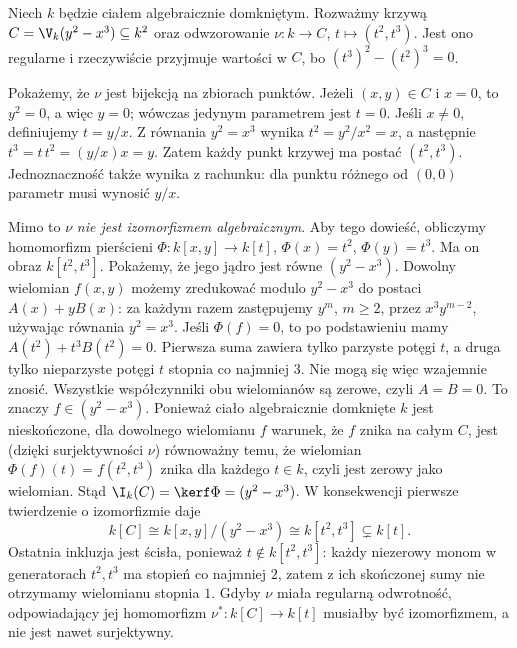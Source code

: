 \begin{przyklad}
\label{pr:cusp}
Niech $k$ będzie ciałem algebraicznie domkniętym.
Rozważmy krzywą
$C=\V_k(y^2-x^3)\subseteq k^2$ oraz odwzorowanie
$\nu:k\to C$, $t\mapsto(t^2,t^3)$.
Jest ono regularne i rzeczywiście przyjmuje wartości w $C$,
bo $(t^3)^2-(t^2)^3=0$.

Pokażemy, że $\nu$ jest bijekcją na zbiorach punktów.
Jeżeli $(x,y)\in C$ i $x=0$, to $y^2=0$, a więc $y=0$;
wówczas jedynym parametrem jest $t=0$.
Jeśli $x\ne0$, definiujemy $t=y/x$. Z równania $y^2=x^3$
wynika $t^2=y^2/x^2=x$, a następnie
$t^3=t\,t^2=(y/x)x=y$. Zatem każdy punkt krzywej ma postać
$(t^2,t^3)$. Jednoznaczność także wynika z rachunku:
dla punktu różnego od $(0,0)$ parametr musi wynosić $y/x$.

Mimo to $\nu$ \emph{nie jest izomorfizmem algebraicznym}.
Aby tego dowieść, obliczymy homomorfizm pierścieni
$\Phi:k[x,y]\to k[t]$, $\Phi(x)=t^2$, $\Phi(y)=t^3$.
Ma on obraz $k[t^2,t^3]$.
Pokażemy, że jego jądro jest równe $(y^2-x^3)$.
Dowolny wielomian $f(x,y)$ możemy zredukować modulo
$y^2-x^3$ do postaci $A(x)+yB(x)$:
za każdym razem zastępujemy $y^m$, $m\ge2$, przez
$x^3y^{m-2}$, używając równania $y^2=x^3$.
Jeśli $\Phi(f)=0$, to po podstawieniu mamy
$A(t^2)+t^3B(t^2)=0$.
Pierwsza suma zawiera tylko parzyste potęgi $t$,
a druga tylko nieparzyste potęgi $t$ stopnia co najmniej $3$.
Nie mogą się więc wzajemnie znosić. Wszystkie współczynniki
obu wielomianów są zerowe, czyli $A=B=0$.
To znaczy $f\in(y^2-x^3)$.
Ponieważ ciało algebraicznie domknięte $k$ jest nieskończone,
dla dowolnego wielomianu $f$ warunek, że $f$ znika na
całym $C$, jest (dzięki surjektywności $\nu$) równoważny temu,
że wielomian $\Phi(f)(t)=f(t^2,t^3)$ znika dla każdego
$t\in k$, czyli jest zerowy jako wielomian.
Stąd $\I_k(C)=\kerf\Phi=(y^2-x^3)$.
W konsekwencji pierwsze twierdzenie o izomorfizmie daje
\[
k[C]\cong k[x,y]/(y^2-x^3)\cong k[t^2,t^3]\subsetneq k[t].
\]
Ostatnia inkluzja jest ścisła, ponieważ $t\notin k[t^2,t^3]$:
każdy niezerowy monom w generatorach $t^2,t^3$
ma stopień co najmniej $2$, zatem z ich skończonej sumy
nie otrzymamy wielomianu stopnia $1$.
Gdyby $\nu$ miała regularną odwrotność, odpowiadający jej
homomorfizm $\nu^*:k[C]\to k[t]$ musiałby być izomorfizmem,
a nie jest nawet surjektywny.
\end{przyklad}

